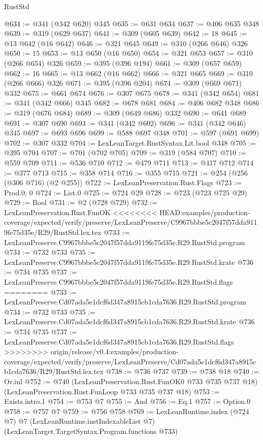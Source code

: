\begin{lexlean}{RustStd}
\begin{coremodule}
{\begin{coremodule}
{{{{{@634 := @341 (@342 @620) @345
@635 := @631 @634
@637 := @406 @635 @348
@639 := @319 (@629 @637)
@641 := @309 (@605 @639)
@642 := 18
@645 := @13 @642 (@16 @642)
@646 := @321 @645
@649 := @310 (@266 @646) @326
@650 := 15
@653 := @13 @650 (@16 @650)
@654 := @321 @653
@657 := @310 (@266 @654) @326
@659 := @395 (@396 @194)
@661 := @309 (@657 @659)
@662 := 16
@665 := @13 @662 (@16 @662)
@666 := @321 @665
@669 := @310 (@266 @666) @326
@671 := @395 (@396 @204)
@674 := @309 (@669 @671) @332
@675 := @661 @674
@676 := @307 @675
@678 := @341 (@342 @654)
@681 := @341 (@342 @666) @345
@682 := @678 @681
@684 := @406 @682 @348
@686 := @319 (@676 @684)
@689 := @309 (@649 @686) @332
@690 := @641 @689
@691 := @307 @690
@693 := @341 (@342 @602)
@696 := @341 (@342 @646) @345
@697 := @693 @696
@699 := @588 @697 @348
@701 := @597 (@691 @699)
@702 := @307 @332
@704 := LexLeanTarget.RustSyntax.Lit.bool @348
@705 := @395 @704
@707 := @701 (@702 @705)
@709 := @319 (@584 @707)
@710 := @559 @709
@711 := @536 @710
@712 := @479 @711
@713 := @417 @712
@714 := @377 @713
@715 := @358 @714
@716 := @355 @715
@721 := @254 (@256 (@306 @716) (@2 @255))
@722 := LexLeanPreservation.Rust.Flags
@723 := Prod.{0, 0}
@724 := List.{0}
@725 := @724 @29
@728 := @723 (@723 @725 @29)
@729 := Bool
@731 := @2 (@728 @729)
@732 := LexLeanPreservation.Rust.FunOK
<<<<<<<< HEAD:examples/production-coverage/expected/verify/preserve/LexLeanPreserve/C9967bbbe5c2047f57dda9119fe75d35e/R29/RustStd.lex.tex
@733 := LexLeanPreserve.C9967bbbe5c2047f57dda9119fe75d35e.R29.RustStd.program
@734 := @732 @733
@735 := LexLeanPreserve.C9967bbbe5c2047f57dda9119fe75d35e.R29.RustStd.krate
@736 := @734 @735
@737 := LexLeanPreserve.C9967bbbe5c2047f57dda9119fe75d35e.R29.RustStd.flags
========
@733 := LexLeanPreserve.Cd07ada5e1dcf6d347a8915cb1cda7636.R29.RustStd.program
@734 := @732 @733
@735 := LexLeanPreserve.Cd07ada5e1dcf6d347a8915cb1cda7636.R29.RustStd.krate
@736 := @734 @735
@737 := LexLeanPreserve.Cd07ada5e1dcf6d347a8915cb1cda7636.R29.RustStd.flags
>>>>>>>> origin/release/v0.4:examples/production-coverage/expected/verify/preserve/LexLeanPreserve/Cd07ada5e1dcf6d347a8915cb1cda7636/R29/RustStd.lex.tex
@738 := @736 @737
@739 := @738 @18
@740 := Or.inl
@752 := @740
    (LexLeanPreservation.Rust.FunOK0 @733 @735 @737 @18)
    (LexLeanPreservation.Rust.FunLoop @733 @735 @737 @18)
@753 := Exists.intro.{1}
@754 := @753 @7
@755 := And
@756 := Eq.{1}
@757 := Option.{0}
@758 := @757 @7
@759 := @756 @758
@769 := LexLeanRuntime.index
    (@724 @7)
    @7
    (LexLeanRuntime.instIndexableList @7)
    (LexLeanTarget.TargetSyntax.Program.functions @733)
}}}}}
\end{coremodule}}
\end{coremodule}
\end{lexlean}
